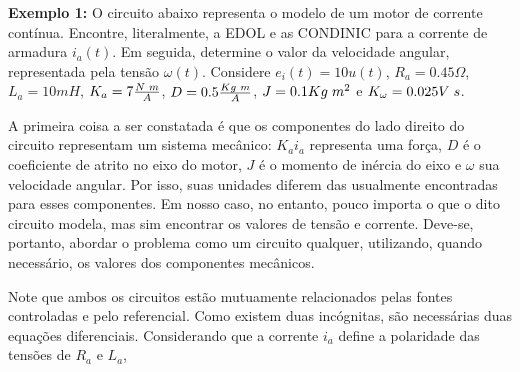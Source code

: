 \documentclass{article}
\numberwithin{equation}{section}
\let\dfr\dfrac
\begin{document}
\noindent\textbf{Exemplo 1:} O circuito abaixo representa o modelo de um motor de corrente contínua. Encontre, literalmente, a EDOL e as CONDINIC para a corrente de armadura $i_a(t)$. Em seguida, determine o valor da velocidade angular, representada pela tensão $\omega(t)$. Considere $e_i(t)=10u(t)$, $R_a=0.45\Omega$, $L_a=10mH$, $K_a=7\frac{N \hspace{1mm} m}{A}$, $D=0.5\frac{Kg \hspace{1mm} m}{A}$, $J=0.1Kg \hspace{1mm} m^2$ e $K_{\omega} = 0.025V \hspace{1mm} s$.

\begin{center}
\end{center}

\noindent A primeira coisa a ser constatada é que os componentes do lado direito do circuito representam um sistema mecânico: $K_a i_a$ representa uma força, $D$ é o coeficiente de atrito no eixo do motor, $J$ é o momento de inércia do eixo e $\omega$ sua velocidade angular. Por isso, suas unidades diferem das usualmente encontradas para esses componentes. Em nosso caso, no entanto, pouco importa o que o dito circuito modela, mas sim encontrar os valores de tensão e corrente. Deve-se, portanto, abordar o problema como um circuito qualquer, utilizando, quando necessário, os valores dos componentes mecânicos.

\vspace{1cm}

\noindent Note que ambos os circuitos estão mutuamente relacionados pelas fontes controladas e pelo referencial. Como existem duas incógnitas, são necessárias duas equações diferenciais. Considerando que a corrente $i_a$ define a polaridade das tensões de $R_a$ e $L_a$,

\begin{center}
\end{center}
\end{document}
